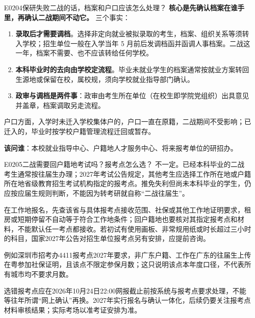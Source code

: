 \begin{qa}{E0204}{保研失败二战的话，档案和户口应该怎么处理？}
\textbf{核心是先确认档案在谁手里，再确认二战期间不动它。}
三个事实：
\begin{enumerate}
  \item \textbf{录取后才需要调档}。选择非定向就业被拟录取的考生，档案、组织关系等须转入学校；招生单位一般在入学当年 5 月前后发调档函并函调人事档案。二战这一年，档案不需要、也不应该转给任何学校。
  \item \textbf{本科毕业时的去向由学校定流程}。毕业未就业学生的档案通常按就业方案转回生源地或保留在校，属校规，须向学校就业指导部门确认。
  \item \textbf{政审与调档是两件事}：政审由考生所在单位（在校生即学院党组织）出具意见并盖章，档案调取另走流程。
\end{enumerate}

户口方面，入学时未迁入学校集体户的，户口一直在原籍，二战期间不受影响；已迁入的，毕业时按学校户籍管理流程迁回或暂存。

\textbf{该问谁}：本校就业指导中心、户籍地人才服务中心、将来报考单位的研招办。
\end{qa}

\begin{qa}{E0205}{二战需要回户籍地考试吗？报考点怎么选？}
不一定。已经本科毕业的二战考生通常按往届生办理；2027年考试公告规定，其他考生应选择工作所在地或户籍所在地省级教育招生考试机构指定的报考点。推免失利但尚未本科毕业的学生，仍应按应届生规则判断，不能因为转考研就自称“二战往届生”。  

在工作地报名，先查该省与具体报考点接收范围、社保或其他工作地证明要求，租房或短期停留不自动等于符合工作地条件；回户籍地也要核对其指定报考点和材料，不能默认任一考点都接收。若初试有使用画板、非常规用纸或时长超过三小时的科目，国家2027年公告对招生单位报考点另有安排，应提前咨询。

例如深圳市招考办4411报考点2027年要求，非广东户籍、工作在广东的往届生上传在粤参加社保证明，且该点不限定参保月数；这只说明该点本年度口径，不代表所有城市均不要求月数。

选错报考点应在2026年10月24日22:00网报截止前按系统与报考点要求处理，不能等往年所谓“网上确认”再换。2027年实行报名与确认一体化，后续仍要关注报考点材料审核结果；实际考场以准考证安排为准。
\end{qa}

